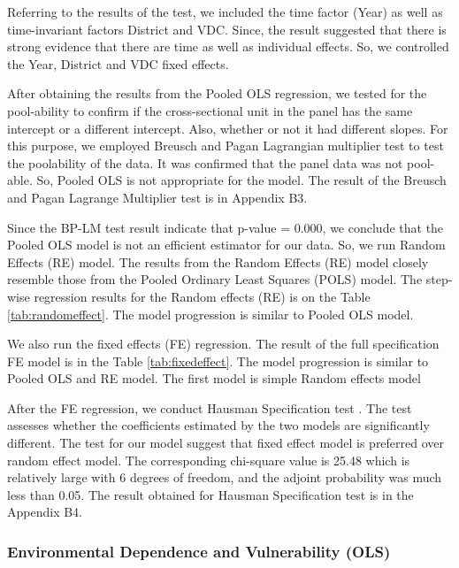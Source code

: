 Referring to the results of the test, we included the time factor (Year) as well as time-invariant factors District and VDC. Since, the result suggested that there is strong evidence that there are time as well as individual effects. So, we controlled the Year, District and VDC fixed effects.\par 

After obtaining the results from the Pooled OLS regression, we tested for the pool-ability to confirm if the cross-sectional unit in the panel has the same intercept or a different intercept. Also, whether or not it had different slopes. For this purpose, we employed Breusch and Pagan Lagrangian multiplier test \citep{breusch1980lagrange} to test the poolability of the data. It was confirmed that the panel data was not pool-able. So, Pooled OLS is not appropriate for the model. The result of the Breusch and Pagan Lagrange Multiplier test is in Appendix B3.\par 

Since the BP-LM test result indicate that p-value = 0.000, we conclude that the Pooled OLS model is not an efficient estimator for our data. So, we run Random Effects (RE) model. The results from the Random Effects (RE) model closely resemble those from the Pooled Ordinary Least Squares (POLS) model. The step-wise regression results for the Random effects (RE) is on the Table \ref{tab:randomeffect}. The model progression is similar to Pooled OLS model.

We also run the fixed effects (FE) regression. The result of the full specification FE model is in the Table \ref{tab:fixedeffect}. The model progression is similar to Pooled OLS and RE model. The first model is simple Random effects model       

After the FE regression, we conduct Hausman Specification test \citep{hausman1978specification}. The test assesses whether the coefficients estimated by the two models are significantly different. The test for our model suggest that fixed effect model is preferred over random effect model. The corresponding chi-square value is 25.48 which is relatively large with 6 degrees of freedom, and the adjoint probability was much less than 0.05. The result obtained for Hausman Specification test is in the Appendix B4.\par 

\subsubsection{Environmental Dependence and Vulnerability (OLS)}

